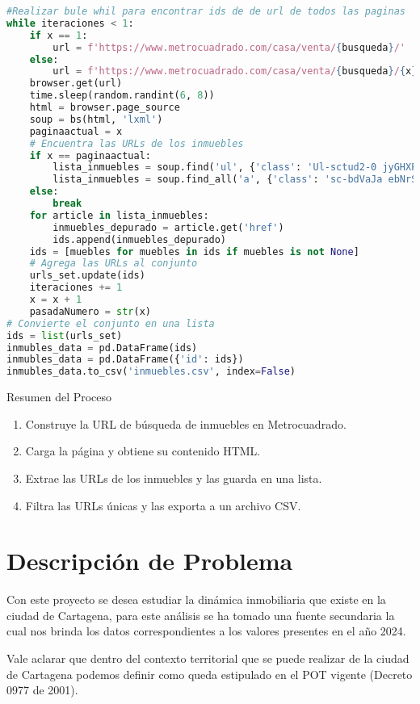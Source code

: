 \documentclass[12pt,a4paper]{article}
\begin{document}
\begin{lstlisting}[language=Python, caption={Almacenar las URL`s de las viviendas}, label={lst:ExtraLib3}]
#Realizar bule whil para encontrar ids de de url de todos las paginas
while iteraciones < 1:
	if x == 1:
		url = f'https://www.metrocuadrado.com/casa/venta/{busqueda}/'
	else:
		url = f'https://www.metrocuadrado.com/casa/venta/{busqueda}/{x}'
	browser.get(url)
	time.sleep(random.randint(6, 8))
	html = browser.page_source	
	soup = bs(html, 'lxml')	
	paginaactual = x	
	# Encuentra las URLs de los inmuebles
	if x == paginaactual:
		lista_inmuebles = soup.find('ul', {'class': 'Ul-sctud2-0 jyGHXP realestate-results-list browse-results-list'}).find_all('li')
		lista_inmuebles = soup.find_all('a', {'class': 'sc-bdVaJa ebNrSm'})	
	else:
		break	
	for article in lista_inmuebles:
		inmuebles_depurado = article.get('href')
		ids.append(inmuebles_depurado)	
	ids = [muebles for muebles in ids if muebles is not None]	
	# Agrega las URLs al conjunto
	urls_set.update(ids)	
	iteraciones += 1
	x = x + 1
	pasadaNumero = str(x)	
# Convierte el conjunto en una lista
ids = list(urls_set)
inmubles_data = pd.DataFrame(ids)
inmubles_data = pd.DataFrame({'id': ids})
inmubles_data.to_csv('inmuebles.csv', index=False)
\end{lstlisting}

Resumen del Proceso

\begin{enumerate}
	\item Construye la URL de búsqueda de inmuebles en Metrocuadrado.
	\item Carga la página y obtiene su contenido HTML.
	\item Extrae las URLs de los inmuebles y las guarda en una lista.
	\item Filtra las URLs únicas y las exporta a un archivo CSV.
\end{enumerate}
 

\section{Descripción de Problema}
Con este proyecto se desea estudiar la dinámica inmobiliaria que existe en la ciudad de Cartagena, para este análisis se ha tomado una fuente secundaria la cual nos brinda los datos correspondientes a los valores presentes en el año 2024.

Vale aclarar que dentro del contexto territorial que se puede realizar de la ciudad de Cartagena podemos definir como queda estipulado en el POT vigente (Decreto 0977 de 2001).
\end{document}
